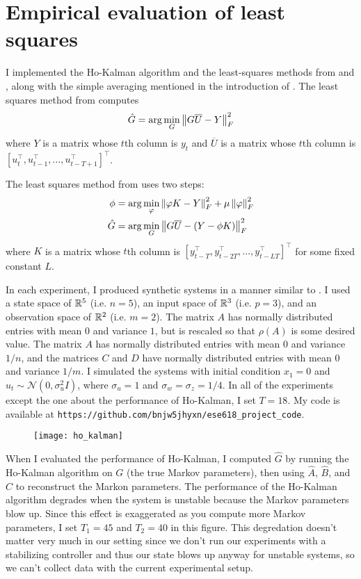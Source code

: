 \section{Empirical evaluation of least squares}

I implemented the Ho-Kalman algorithm
and the least-squares methods from \cite{oymak2019singletraj}
and \cite{simchowitz2019parametric},
along with the simple averaging mentioned
in the introduction of \cite{oymak2019singletraj}.
The least squares method from \cite{oymak2019singletraj} computes
\[ \hat G = \arg\min_G \left\Vert{G \overline{U} - Y}\right\Vert_F^2 \]
where $Y$ is a matrix whose $t$th column is $y_t$
and $\overline U$ is a matrix whose $t$th column is
$[u_t^\top, u_{t-1}^\top, \ldots, u_{t-T+1}^\top]^\top$.

The least squares method from \cite{oymak2019singletraj} uses two steps:
\begin{align*}
\phi &= \arg\min_\varphi \left\Vert{\varphi K - Y}\right\Vert_F^2 + \mu \left\Vert{\varphi}\right\Vert_F^2 \\
\hat G &= \arg\min_G \left\Vert{G \overline{U} - (Y - \phi K)}\right\Vert_F^2
\end{align*}
where $K$ is a matrix whose $t$th column is
$[y_{t-T}^\top, y_{t-2T}^\top, \ldots, y_{t-LT}^\top]^\top$
for some fixed constant $L$.

In each experiment, I produced synthetic systems
in a manner similar to \cite{oymak2019singletraj}.
I used a state space of $\mathbb{R}^5$ (i.e. $n = 5$),
an input space of $\mathbb{R}^3$ (i.e. $p = 3$),
and an observation space of $\mathbb{R}^2$ (i.e. $m = 2$).
The matrix $A$ has normally distributed entries
with mean $0$ and variance $1$,
but is rescaled so that $\rho(A)$ is some desired value.
The matrix $A$ has normally distributed entries
with mean $0$ and variance $1/n$,
and the matrices $C$ and $D$ have normally distributed entries
with mean $0$ and variance $1/m$.
I simulated the systems with initial condition $x_1 = 0$
and $u_t \sim \mathcal N(0, \sigma_u^2 I)$,
where $\sigma_u = 1$ and $\sigma_w = \sigma_z = 1/4$.
In all of the experiments
except the one about the performance of Ho-Kalman,
I set $T = 18$.
My code is available at
{\tt https://github.com/bnjw5jhyxn/ese618\_project\_code}.

\begin{figure}
\texttt{[image: ho\_kalman]}
\end{figure}
When I evaluated the performance of Ho-Kalman,
I computed $\hat G$
by running the Ho-Kalman algorithm on $G$
(the true Markov parameters),
then using $\hat A$, $\hat B$, and $\hat C$
to reconstruct the Markon parameters.
The performance of the Ho-Kalman algorithm
degrades when the system is unstable
because the Markov parameters blow up.
Since this effect is exaggerated
as you compute more Markov parameters,
I set $T_1 = 45$ and $T_2 = 40$ in this figure.
This degredation doesn't matter very much
in our setting since we don't run our experiments
with a stabilizing controller
and thus our state blows up anyway for unstable systems,
so we can't collect data with the current experimental setup.

